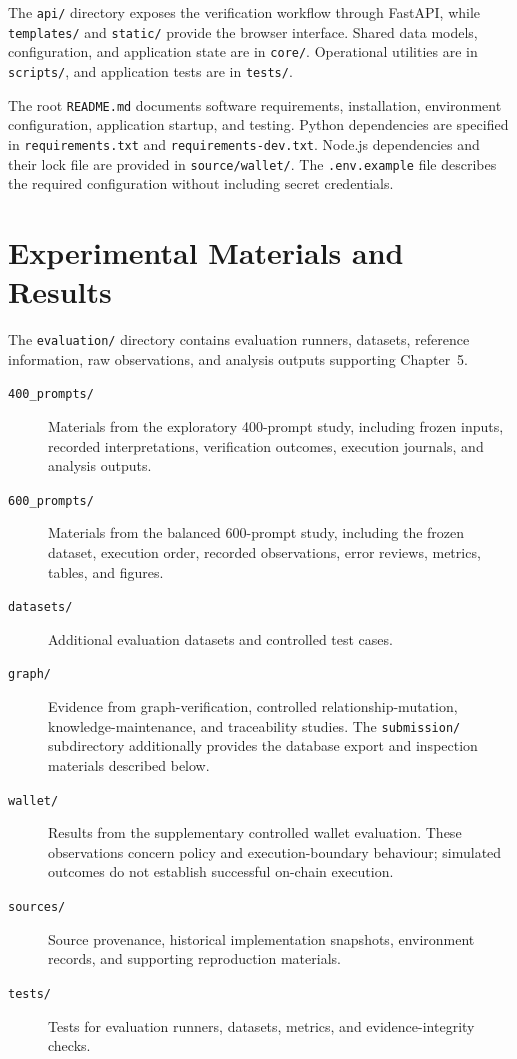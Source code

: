 The \texttt{api/} directory exposes the verification workflow through
FastAPI, while \texttt{templates/} and \texttt{static/} provide the
browser interface. Shared data models, configuration, and application
state are in \texttt{core/}. Operational utilities are in
\texttt{scripts/}, and application tests are in \texttt{tests/}.

The root \texttt{README.md} documents software requirements,
installation, environment configuration, application startup, and
testing. Python dependencies are specified in
\texttt{requirements.txt} and \texttt{requirements-dev.txt}.
Node.js dependencies and their lock file are provided in
\texttt{source/wallet/}. The \texttt{.env.example} file describes
the required configuration without including secret credentials.

\section{Experimental Materials and Results}

The \texttt{evaluation/} directory contains evaluation runners,
datasets, reference information, raw observations, and analysis
outputs supporting Chapter~5.

\begin{description}
    \item[\texttt{400\_prompts/}]
    Materials from the exploratory 400-prompt study, including
    frozen inputs, recorded interpretations, verification outcomes,
    execution journals, and analysis outputs.

    \item[\texttt{600\_prompts/}]
    Materials from the balanced 600-prompt study, including
    the frozen dataset, execution order, recorded observations,
    error reviews, metrics, tables, and figures.

    \item[\texttt{datasets/}]
    Additional evaluation datasets and controlled test cases.

    \item[\texttt{graph/}]
    Evidence from graph-verification, controlled
    relationship-mutation, knowledge-maintenance, and traceability
    studies. The \texttt{submission/} subdirectory additionally
    provides the database export and inspection materials described
    below.

    \item[\texttt{wallet/}]
    Results from the supplementary controlled wallet evaluation.
    These observations concern policy and execution-boundary
    behaviour; simulated outcomes do not establish successful
    on-chain execution.

    \item[\texttt{sources/}]
    Source provenance, historical implementation snapshots,
    environment records, and supporting reproduction materials.

    \item[\texttt{tests/}]
    Tests for evaluation runners, datasets, metrics, and
    evidence-integrity checks.
\end{description}

